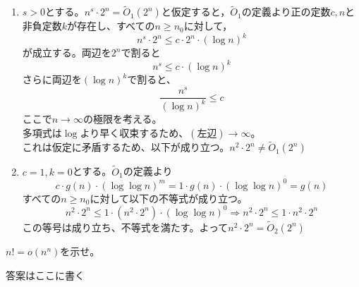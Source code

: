 \documentclass[dvipdfmx]{jsreport}
\begin{document}
\begin{souanswer} %
\begin{enumerate}
	\item $s> 0$とする。$n^s\cdot 2^n= \tilde{O}_1(2^n)$と仮定すると，$\tilde{O}_1$の定義より正の定数$c, n$と非負定数$k$が存在し、すべての$n\ge n_0$に対して，
\begin{equation*}
	n^s\cdot 2^n\le c\cdot 2^n\cdot (\log{n})^k
\end{equation*}
	が成立する。両辺を$2^n$で割ると
\begin{equation*}
	n^s \le c\cdot (\log{n})^k
\end{equation*}
	さらに両辺を$(\log{n})^k$で割ると、
\begin{equation*}
	\frac{n^s}{(\log{n})^k}\le c
\end{equation*}
	ここで$n\to \infty$の極限を考える。\\
	多項式は$\log{}$より早く収束するため、$(左辺)\to \infty$。\\
	これは仮定に矛盾するため、以下が成り立つ。$n^2\cdot 2^n\ne \tilde{O}_1(2^n)$

	\item $c= 1, k= 0$とする。$\tilde{O}_1$の定義より
\begin{equation*}
	c\cdot g(n)\cdot (\log{\log{n}})^m= 1\cdot g(n)\cdot (\log{\log{n}})^0= g(n)
\end{equation*}
	すべての$n\ge n_0$に対して以下の不等式が成り立つ。
\begin{equation*}
	n^2\cdot 2^n\le 1\cdot (n^2\cdot 2^n)\cdot (\log{\log{n}})^0\Rightarrow n^2\cdot 2^n\le 1\cdot n^2\cdot 2^n
\end{equation*}
	この等号は成り立ち、不等式を満たす。よって$n^2\cdot 2^n= \tilde{O}_2(2^n)$
\end{enumerate}
\end{souanswer}


\begin{tcolorbox}
	$n!= o(n^n)$を示せ。
\end{tcolorbox}

\begin{souanswer} %
	答案はここに書く
\end{souanswer}
\end{document}
